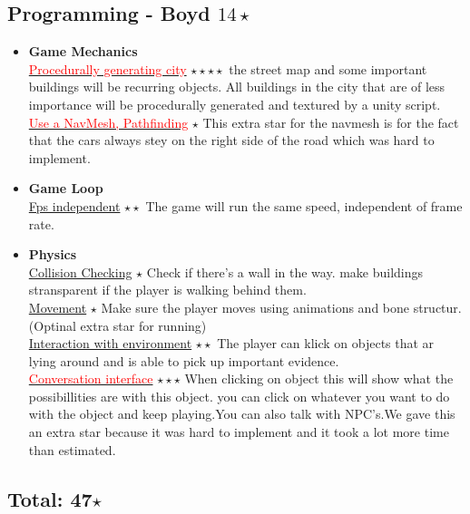 \documentclass{article}
\begin{document}
		\subsection{Programming - Boyd $14 \star$}
			\begin{itemize}
				\item \textbf{Game Mechanics}\\
					\underline \textcolor{red}{Procedurally generating city} $\star \star \star \star$  the street map and some important buildings will be recurring objects. All buildings in the city that are of less importance will be procedurally generated and textured by a unity script.
				      	\underline \textcolor{red}{Use a NavMesh, Pathfinding} $\star$ This extra star for the navmesh is for the fact that the cars always stey on the right side of the road which was hard to implement.	

				\item \textbf{Game Loop}\\
					\underline{Fps independent} $\star \star$ The game will run the same speed, independent of frame rate.
				\item \textbf{Physics}\\
					\underline{Collision Checking} $\star$ Check if there's a wall in the way. make buildings stransparent if the player is walking behind them.\\
					\underline{Movement} $\star$ Make sure the player moves using animations and bone structur. (Optinal extra star for running)\\
					\underline{Interaction with environment} $\star \star$ The player can klick on objects that ar lying around and is able to pick up important evidence.\\
					\underline \textcolor{red}{Conversation interface} $\star \star \star$ When clicking on object this will show what the possibillities are with this object. you can click on whatever you want to do with the object and keep playing.You can also talk with NPC's.We gave this an extra star because it was hard to implement and it took a lot more time than estimated.
			\end{itemize}

			\subsection*{Total: 47$\star$}

			
\end{document}
